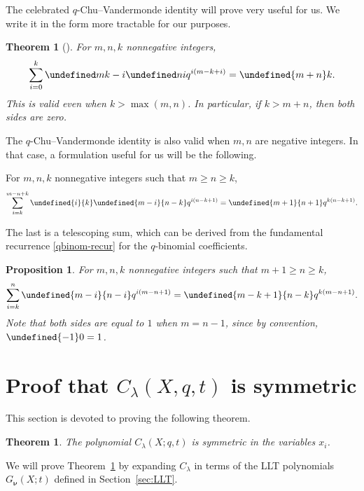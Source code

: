 \documentclass[11pt]{article}
\newtheorem{proposition}[theo]{Proposition}
\newtheorem{theorem}[theo]{Theorem}
\theoremstyle{definition}
\providecommand{\qbinom}[2]{\genfrac{[}{]}{0pt}{}{#1}{#2}}
\numberwithin{equation}{section}
\let\qbinom\undefined
\newcommand{\qbinom}[2]{\bgroup\renewcommand*{\arraystretch}{1}\begin{bmatrix} #1 \\ #2\end{bmatrix} \egroup}
\begin{document}
The celebrated $q$-Chu--Vandermonde identity will prove very useful for us. 
We write it in the form more tractable for our purposes.

\begin{theorem}[{\cite[Equations (1.5.2) and (1.5.3)]{gasper-rahman-2004}}]
\label{thm:q-chuvan}
For $m,n,k$ nonnegative integers,
\[
\sum_{i=0}^k \qbinom m{k-i} \qbinom ni q^{i(m-k+i)} = \qbinom {m+n}k.
\]
This is valid even when $k > \max(m,n)$. In particular, if $k > m+n$, then both sides are zero.
\end{theorem}

The $q$-Chu--Vandermonde identity is also valid when $m,n$ are negative
integers. In that case, a formulation useful for us will be the following.

\begin{cor}
\label{cor:q-dualchu}
For $m,n,k$ nonnegative integers such that $m \geq n \geq k$,
\[
\sum_{i=k}^{m-n+k} \qbinom {i}{k} \qbinom {m-i}{n-k} q^{i(n-k+1)} = \qbinom {m+1}{n+1} q^{k(n-k+1)}.
\]
\end{cor}


The last is a telescoping sum, which can be derived from the fundamental 
recurrence \eqref{qbinom-recur} for the $q$-binomial coefficients.

\begin{proposition}
\label{prop:q-telescope}
For $m,n,k$ nonnegative integers such that $m+1 \geq n \geq k$,
\[
\sum_{i=k}^n \qbinom {m-i}{n-i} q^{i(m-n+1)} = \qbinom {m-k+1}{n-k} q^{k(m-n+1)}.
\]
Note that both sides are equal to $1$ when $m = n-1$, since by convention, $\qbinom {-1}0 = 1$.
\end{proposition}


\section{Proof that $C_{\lambda}(X,q,t)$ is symmetric}
\label{sec:sym}

This section is devoted to proving the following theorem.

\begin{theorem}\label{thm:symmetry}
The polynomial $C_{\lambda}(X; q,t)$ is symmetric in the variables $x_i$.
\end{theorem}

We will prove Theorem~\ref{thm:symmetry} by expanding $C_{\lambda}$ in terms of the LLT polynomials $G_{\boldsymbol{\nu}}(X;t)$ 
defined in Section~\ref{sec:LLT}.
\end{document}
